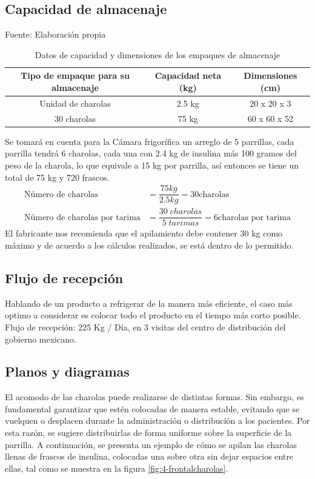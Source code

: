  \subsection{Capacidad de almacenaje}
 \begin{table}[H]
 	\centering
 	\caption{Datos de capacidad y dimensiones de los empaques de almacenaje}\rspitems Fuente: Elaboración propia
 	\begin{tabular}{ccc}
 		\hline
 		\textbf{Tipo de empaque para su almacenaje} & \textbf{Capacidad neta (kg)} & \textbf{Dimensiones (cm)} \\ \hline
 		Unidad de charolas & 2.5 kg & 20 x 20 x 3 \\  
 		30 charolas & 75 kg & 60 x 60 x 52 \\  
 		\hline
 	\end{tabular} 	
 	\label{tabla:almacenaje}
 \end{table}
 
 Se tomará en cuenta para la Cámara frigorífica un arreglo de 5 parrillas, cada parrilla
 tendrá 6 charolas, cada una con 2.4 kg de insulina más 100 gramos del peso de la charola, lo que equivale a 15 kg por parrilla, así entonces se tiene un total de 75 kg y 720 frascos.
 \begin{equation}
 \begin{aligned}
 	\text{Número de charolas} &= \dfrac{75 kg}{2.5kg} = 30 \text{charolas}\\
 		\text{Número de charolas por tarima} &= \dfrac{30\; charolas}{5\; tarimas} = 6 \text{charolas por tarima}
 \end{aligned}
\end{equation}
El fabricante nos recomienda que el apilamiento debe contener 30 kg como máximo y de acuerdo a los cálculos realizados, se está dentro de lo permitido.

\subsection{Flujo de recepción}

Hablando de un producto a refrigerar de la manera más eficiente, el caso más optimo a considerar es colocar todo el producto en el tiempo más corto posible. Flujo de recepción: 225 Kg / Día, en 3 visitas del centro de distribución del gobierno mexicano.


\subsection{Planos y diagramas}
El acomodo de las charolas puede realizarse de distintas formas. Sin embargo, es fundamental garantizar que estén colocadas de manera estable, evitando que se vuelquen o desplacen durante la administración o distribución a los pacientes. Por esta razón, se sugiere distribuirlas de forma uniforme sobre la superficie de la parrilla. A continuación, se presenta un ejemplo de cómo se apilan las charolas llenas de frascos de insulina, colocadas una sobre otra sin dejar espacios entre ellas, tal como se muestra en la figura \ref{fig:4-frontalcharolas}.


